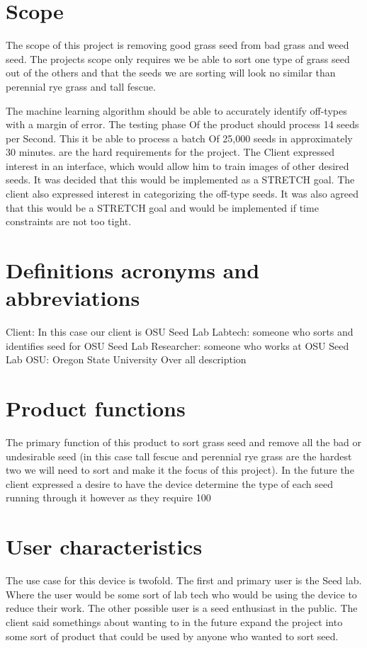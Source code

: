 \documentclass[onecolumn, draftclsnofoot,10pt, compsoc]{IEEEtran}
\begin{document}
 \section{Scope}
The scope of this project is removing good grass seed from bad grass and weed seed.
The projects scope only requires we be able to sort one type of grass seed out of the others and that the seeds we are sorting will look no similar than perennial rye grass and tall fescue.

The machine learning algorithm should be able to accurately identify off-types with a margin of error.
The testing phase Of the product should process 14 seeds per Second.
This it be able to process a batch Of 25,000 seeds in approximately 30 minutes. are the hard requirements for the project.
The Client expressed interest in an interface, which would allow him to train images of other desired seeds.
It was decided that this would be implemented as a STRETCH goal.
The client also expressed interest in categorizing the off-type seeds.
It was also agreed that this would be a STRETCH goal and would be implemented if time constraints are not too tight. 
 \section{Definitions acronyms and abbreviations}
Client: In this case our client is OSU Seed Lab
Labtech: someone who sorts and identifies seed for OSU Seed Lab
Researcher: someone who works at OSU Seed Lab
OSU: Oregon State University
Over all description
\section{Product functions}
The primary function of this product to sort grass seed and remove all the bad or undesirable seed (in this case tall fescue and perennial rye grass are the hardest two we will need to sort and make it the focus of this project).
In the future the client expressed a desire to have the device determine the type of each seed running through it however as they require 100%
\section{User characteristics}
The use case for this device is twofold.
The first and primary user is the Seed lab.
Where the user would be some sort of lab tech who would be using the device to reduce their work.
The other possible user is a seed enthusiast in the public.
The client said somethings about wanting to in the future expand the project into some sort of product that could be used by anyone who wanted to sort seed.
\end{document}
